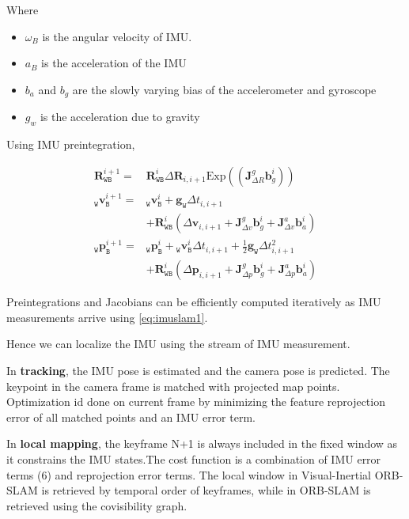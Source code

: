 Where
\begin{itemize}
	\item ${\omega }_{B}$ is the angular velocity of IMU.
	\item ${a}_{B}$ is the acceleration of the IMU
	\item $b_a$ and $b_g$ are the slowly varying bias of the accelerometer and gyroscope
	\item $g_w$ is the acceleration due to gravity
\end{itemize}

Using IMU preintegration, 

\begin{align} \label{eq:imuslam1} \mathbf {R}^{i+1}_\mathtt {WB} = & \mathbf {R}^{i}_\mathtt {WB} \Delta \mathbf {R}_{i,i+1} \text{Exp}\left(\left(\mathbf {J}^g_{\Delta R}\mathbf {b}^i_g\right)\right) \nonumber\\ _\mathtt {W}\mathbf {v}^{i+1}_\mathtt {B} = & {_\mathtt {W}\mathbf {v}^{i}_\mathtt {B}} + \mathbf {g}_\mathtt {W} \Delta t_{i,i+1} \nonumber\\ &+ \mathbf {R}^{i}_\mathtt {WB} \left(\Delta \mathbf {v}_{i,i+1} + \mathbf {J}^g_{\Delta v} \mathbf {b}^i_g + \mathbf {J}^a_{\Delta v} \mathbf {b}^i_a\right) \nonumber\\ _\mathtt {W}\mathbf {p}^{i+1}_\mathtt {B} = & {_\mathtt {W}\mathbf {p}^{i}_\mathtt {B}} + {_\mathtt {W}\mathbf {v}^{i}_\mathtt {B}} \Delta t_{i,i+1} + \frac{1}{2}\mathbf {g}_\mathtt {W} \Delta t^2_{i,i+1} \nonumber\\ & + \mathbf {R}^{i}_\mathtt {WB} \left(\Delta \mathbf {p}_{i,i+1} + \mathbf {J}^g_{\Delta p} \mathbf {b}^i_g + \mathbf {J}^a_{\Delta p} \mathbf {b}^i_a\right) \end{align}

Preintegrations and Jacobians can be efficiently computed iteratively as IMU measurements arrive using \ref{eq:imuslam1}.

Hence we can localize the IMU using the stream of IMU measurement.

In \textbf{tracking}, the IMU pose is estimated and the camera pose is predicted. The keypoint in the camera frame is matched with projected map points. Optimization id done on current frame by minimizing the feature reprojection error of all matched points and an IMU error term. 

In \textbf{local mapping}, the keyframe N+1 is always included in the fixed window as it constrains the IMU states.The cost function is a combination of IMU error terms (6) and reprojection error terms. The local window in Visual-Inertial ORB-SLAM is retrieved by temporal order of keyframes, while in ORB-SLAM is retrieved using the covisibility graph.

